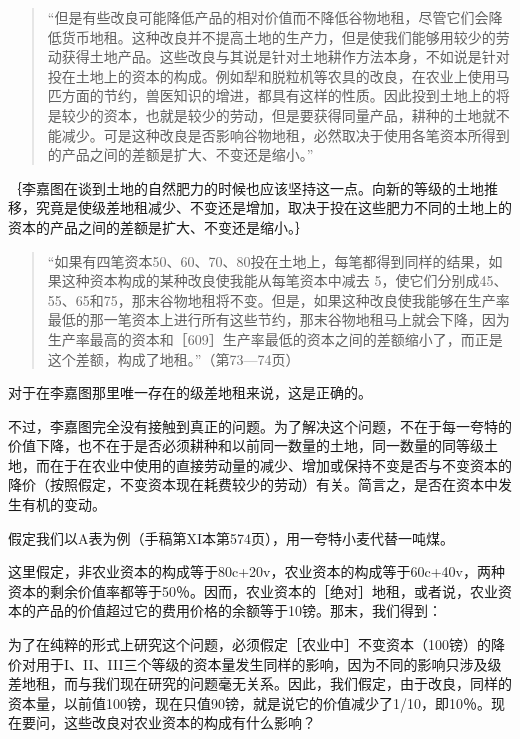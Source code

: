 \todo{}

\begin{quote}“但是有些改良可能降低产品的相对价值而不降低谷物地租，尽管它们会降低货币地租。这种改良并不提高土地的生产力，但是使我们能够用较少的劳动获得土地产品。这些改良与其说是针对土地耕作方法本身，不如说是针对投在土地上的资本的构成。例如犁和脱粒机等农具的改良，在农业上使用马匹方面的节约，兽医知识的增进，都具有这样的性质。因此投到土地上的将是较少的资本，也就是较少的劳动，但是要获得同量产品，耕种的土地就不能减少。可是这种改良是否影响谷物地租，必然取决于使用各笔资本所得到的产品之间的差额是扩大、不变还是缩小。”\end{quote}

｛李嘉图在谈到土地的自然肥力的时候也应该坚持这一点。向新的等级的土地推移，究竟是使级差地租减少、不变还是增加，取决于投在这些肥力不同的土地上的资本的产品之间的差额是扩大、不变还是缩小。｝

\begin{quote}“如果有四笔资本50、60、70、80投在土地上，每笔都得到同样的结果，如果这种资本构成的某种改良使我能从每笔资本中减去 5，使它们分别成45、55、65和75，那末谷物地租将不变。但是，如果这种改良使我能够在生产率最低的那一笔资本上进行所有这些节约，那末谷物地租马上就会下降，因为生产率最高的资本和［609］生产率最低的资本之间的差额缩小了，而正是这个差额，构成了地租。”（第73—74页）\end{quote}

对于在李嘉图那里唯一存在的级差地租来说，这是正确的。

不过，李嘉图完全没有接触到真正的问题。为了解决这个问题，不在于每一夸特的价值下降，也不在于是否必须耕种和以前同一数量的土地，同一数量的同等级土地，而在于在农业中使用的直接劳动量的减少、增加或保持不变是否与不变资本的降价（按照假定，不变资本现在耗费较少的劳动）有关。简言之，是否在资本中发生有机的变动。

假定我们以A表为例（手稿第XI本第574页），用一夸特小麦代替一吨煤。

这里假定，非农业资本的构成等于80c+20v，农业资本的构成等于60c+40v，两种资本的剩余价值率都等于50％。因而，农业资本的［绝对］地租，或者说，农业资本的产品的价值超过它的费用价格的余额等于10镑。那末，我们得到：

\todo{}

为了在纯粹的形式上研究这个问题，必须假定［农业中］不变资本（100镑）的降价对用于I、II、III三个等级的资本量发生同样的影响，因为不同的影响只涉及级差地租，而与我们现在研究的问题毫无关系。因此，我们假定，由于改良，同样的资本量，以前值100镑，现在只值90镑，就是说它的价值减少了1/10，即10％。现在要问，这些改良对农业资本的构成有什么影响？

